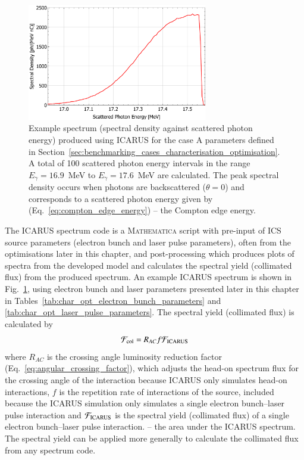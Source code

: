 \documentclass[../main.tex]{subfiles}
\begin{document}
\begin{figure}[!h]
\centering
\includegraphics[width=0.7\textwidth]{Figures/Optimisation_and_Characterisation_of_Inverse_Compton_Scattering_Sources/CaseA_example.pdf}
\caption{Example spectrum (spectral density against scattered photon energy) produced using \textsc{ICARUS} for the case A parameters defined in Section~\ref{sec:benchmarking_cases_characterisation_optimisation}. A total of 100 scattered photon energy intervals in the range $E_{\gamma} = 16.9$~\si{\mega\electronvolt} to $E_{\gamma} = 17.6$~\si{\mega\electronvolt} are calculated. The peak spectral density occurs when photons are backscattered ($\theta=0$) and corresponds to a scattered photon energy given by (Eq.~\ref{eq:compton_edge_energy}) -- the Compton edge energy. }
\label{fig:example_ICARUS_caseA}
\end{figure}
The \textsc{ICARUS} spectrum code is a \textsc{Mathematica} script with pre-input of ICS source parameters (electron bunch and laser pulse parameters), often from the optimisations later in this chapter, and post-processing which produces plots of spectra from the developed model and calculates the spectral yield (collimated flux) from the produced spectrum. An example \textsc{ICARUS} spectrum is shown in Fig.~\ref{fig:example_ICARUS_caseA}, using electron bunch and laser parameters presented later in this chapter in Tables~\ref{tab:char_opt_electron_bunch_parameters} and \ref{tab:char_opt_laser_pulse_parameters}. The spectral yield (collimated flux) is calculated by 
\begin{equation}
\mathcal{F}_{\mathrm{col}} = R_{AC}f\mathcal{F}_{\mathrm{\textsc{ICARUS}}}    
\label{eq:spectral_yield}
\end{equation}
where $R_{AC}$ is the crossing angle luminosity reduction factor (Eq.~\ref{eq:angular_crossing_factor}), which adjusts the head-on spectrum flux for the crossing angle of the interaction because \textsc{ICARUS} only simulates head-on interactions, $f$ is the repetition rate of interactions of the source, included because the \textsc{ICARUS} simulation only simulates a single electron bunch--laser pulse interaction and $\mathcal{F}_{\mathrm{\textsc{ICARUS}}}$ is the spectral yield (collimated flux) of a single electron bunch--laser pulse interaction. -- the area under the \textsc{ICARUS} spectrum. The spectral yield can be applied more generally to calculate the collimated flux from any spectrum code. 
\end{document}
